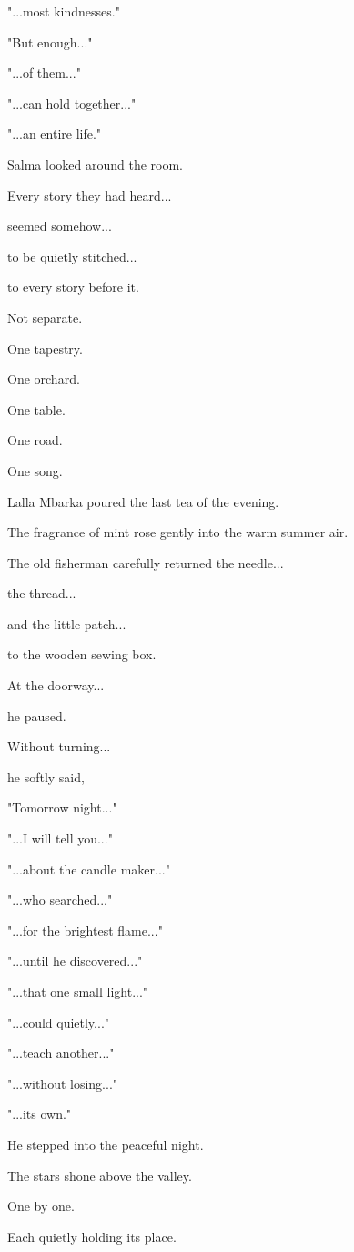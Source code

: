 \documentclass[12pt,openany]{book}
\begin{document}
"...most kindnesses."

"But enough..."

"...of them..."

"...can hold together..."

"...an entire life."

Salma looked around the room.

Every story they had heard...

seemed somehow...

to be quietly stitched...

to every story before it.

Not separate.

One tapestry.

One orchard.

One table.

One road.

One song.

Lalla Mbarka poured the last tea of the evening.

The fragrance of mint rose gently into the warm summer air.

The old fisherman carefully returned the needle...

the thread...

and the little patch...

to the wooden sewing box.

At the doorway...

he paused.

Without turning...

he softly said,

"Tomorrow night..."

"...I will tell you..."

"...about the candle maker..."

"...who searched..."

"...for the brightest flame..."

"...until he discovered..."

"...that one small light..."

"...could quietly..."

"...teach another..."

"...without losing..."

"...its own."

He stepped into the peaceful night.

The stars shone above the valley.

One by one.

Each quietly holding its place.
\end{document}
